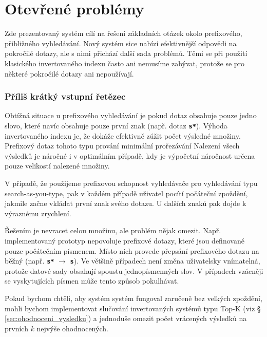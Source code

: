 \documentclass[11pt,letterpaper,oneside,openright]{book}
\newcommand{\bftt}[1]{\texttt{\textbf{#1}}}
\begin{document}
\section{Otevřené problémy}
Zde prezentovaný systém cílí na řešení základních otázek okolo prefixového,
přibližného vyhledávání. Nový systém sice nabízí efektivnější odpovědi na
pokročilé dotazy, ale s nimi přichází další sada problémů. Těmi se při použití
klasického invertovaného indexu často ani nemusíme zabývat, protože se pro
některé pokročilé dotazy ani nepoužívají.

\subsubsection{Příliš krátký vstupní řetězec}
Obtížná situace u prefixového vyhledávání je pokud dotaz obsahuje pouze jedno
slovo, které navíc obsahuje pouze první znak (např. dotaz \bftt{s*}). Výhoda
invertovaného indexu je, že dokáže efektivně zúžit počet výsledné množiny.
Prefixový dotaz tohoto typu prování minimální prořezávání Nalezení všech
výsledků je náročné i v optimálním případě, kdy je výpočetní náročnost určena
pouze velikostí nalezené množiny.

V případě, že použijeme prefixovou schopnost vyhledávače pro vyhledávání typu
search-as-you-type, pak v každém případě uživatel pocítí počáteční zpoždění,
jakmile začne vkládat první znak svého dotazu. U dalších znaků pak dojde k
výraznému zrychlení.

Řešením je nevracet celou množinu, ale problém nějak omezit. Např.
implementovaný prototyp nepovoluje prefixové dotazy, které jsou definované
pouze počátečním písmenem. Místo nich provede přepsání prefixového dotazu na
běžný (např. \bftt{s*} $\rightarrow$ \bftt{s}). Ve většině případech není změna
uživatelsky vnímatelná, protože datové sady obsahují spoustu jednopísmenných
slov. V případech vzácněji se vyskytujících písmen může tento způsob
pokulhávat.

Pokud bychom chtěli, aby systém systém fungoval zaručeně bez velkých zpoždění,
mohli bychom implementovat slučování invertovaných systémů typu Top-K (viz
\S\,\ref{sec:ohodnoceni_vysledku}) a jednoduše omezit počet vrácených výsledků
na prvních $k$ nejvýše ohodnocených.
\end{document}
